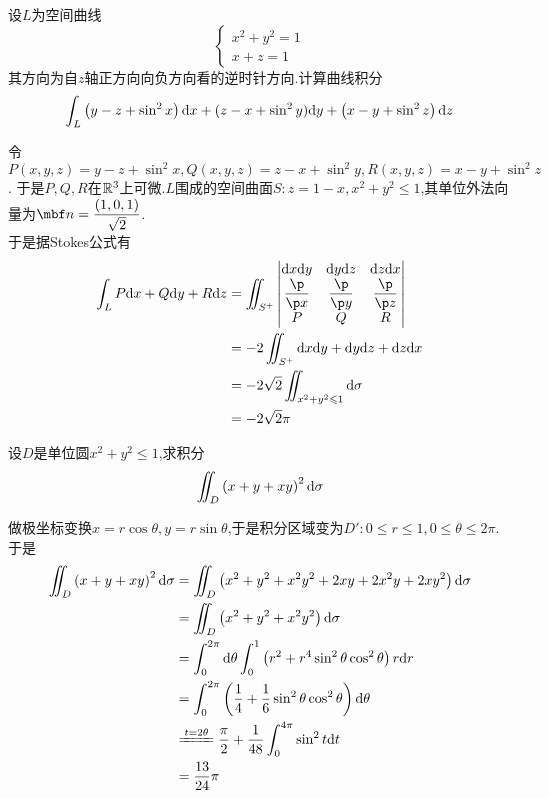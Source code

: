 \documentclass{ctexart}
\begin{document}
\begin{problem}[5.(10\songti{分})]
    设$L$为空间曲线
    \[\left\{\begin{array}{l}
        x^2+y^2=1\\
        x+z=1
    \end{array}\right.\]
    其方向为自$z$轴正方向向负方向看的逆时针方向.计算曲线积分
    \[\int_{L}\left(y-z+\sin^2x\right)\mathrm{d} x+(z-x+\sin^2y)\mathrm{d} y+\left(x-y+\sin^2z\right)\mathrm{d} z\]

\end{problem}
\begin{solution}
    令$P(x,y,z)=y-z+\sin^2x,Q(x,y,z)=z-x+\sin^2y,R(x,y,z)=x-y+\sin^2z$.%
    于是$P,Q,R$在$\mathbb{R}^3$上可微.$L$围成的空间曲面$S:z=1-x,x^2+y^2\leqslant 1$,其单位外法向量为$\mbf n=\dfrac{(1,0,1)}{\sqrt2}$.\\
    于是据Stokes公式有
    \[\begin{aligned}
        \int_LP\di x+Q\di y+R\di z
        &= \iint_{S^+}\begin{vmatrix}
            \di x\di y&\di y\di z&\di z\di x\\
            \dfrac{\p}{\p x}&\dfrac{\p}{\p y}&\dfrac{\p}{\p z}\\
            P&Q&R
        \end{vmatrix}\\
        &= -2\iint_{S^+}\dx\di y+\di y\di z+\di z\di x \\
        &= -2\sqrt2\iint_{x^2+y^2\leqslant 1}\di\sigma \\
        &= -2\sqrt2\pi
    \end{aligned}\]
    
\end{solution}
\begin{problem}[6.(10\songti{分})]
    设$D$是单位圆$x^2+y^2\leqslant1$,求积分
    \[\iint_D\left(x+y+xy\right)^2\mathrm{d}\sigma\]

\end{problem}
\begin{solution}
    做极坐标变换$x=r\cos\theta,y=r\sin\theta$,于是积分区域变为$D':0\leqslant r\leqslant 1,0\leqslant\theta\leqslant2\pi$.于是
    \[\begin{aligned}
        \iint_{D}\left(x+y+xy\right)^2\di\sigma
        &= \iint_{D}\left(x^2+y^2+x^2y^2+2xy+2x^2y+2xy^2\right)\di\sigma \\
        &= \iint_{D}\left(x^2+y^2+x^2y^2\right)\di\sigma \\
        &= \int_0^{2\pi}\di\theta\int_0^1\left(r^2+r^4\sin^2\theta\cos^2\theta\right)r\di r \\
        &= \int_0^{2\pi}\left(\dfrac14+\dfrac16\sin^2\theta\cos^2\theta\right)\di\theta \\
        &\xlongequal{t=2\theta} \dfrac\pi2+\dfrac{1}{48}\int_0^{4\pi}\sin^2 t\di t \\
        &= \dfrac{13}{24}\pi
    \end{aligned}\]
\end{solution}
\end{document}
